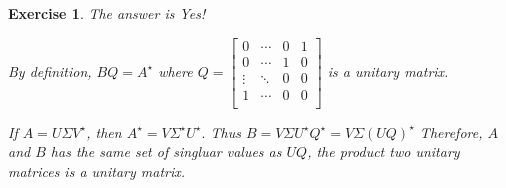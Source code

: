 \documentclass[paper=a4, fontsize=11pt]{scrartcl} %
\numberwithin{equation}{section} %
\numberwithin{figure}{section} %
\numberwithin{table}{section} %
\newtheorem{exercise}{Exercise}
\numberwithin{exercise}{section}
\begin{document}
\begin{exercise}
The answer is Yes!

By definition, $BQ=A^{\star}$ where 
$Q=\begin{bmatrix}
0 & \cdots &  0& 1 \\
0 & \cdots & 1 & 0 \\
 \vdots & \ddots & 0 & 0 \\
1 & \cdots & 0 & 0\\
\end{bmatrix}$ is a unitary matrix.

If $A=U\Sigma V^{\star}$, then $A^{\star}=V\Sigma^{\star} U^{\star}.$
Thus $B=V\Sigma U^{\star}Q^{\star}=V\Sigma (UQ)^{\star}$ Therefore, $A$ and $B$ has the same set of singluar values as $UQ$, the product two unitary matrices is a unitary matrix.
\end{exercise}
\end{document}
